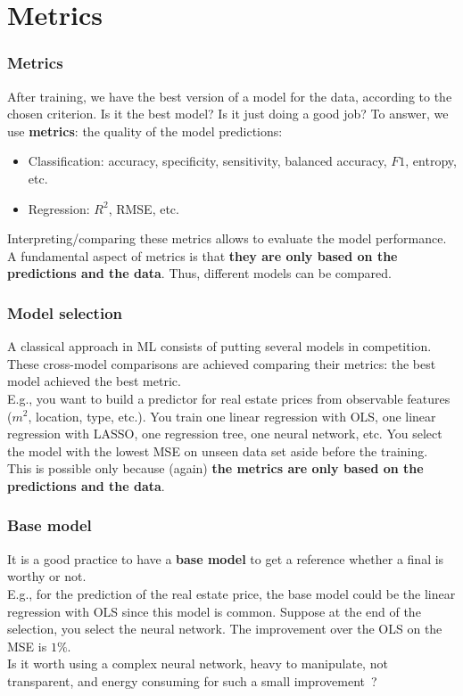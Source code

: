 \section{Metrics}
\begin{frame}
\frametitle{Metrics}
After training, we have the best version of a model for the data, according to the chosen criterion. Is it the best model? Is it just doing a good job? To answer, we use {\bf metrics}: the quality of the model predictions: 
\begin{itemize}
\item Classification: accuracy, specificity, sensitivity, balanced accuracy, $F1$, entropy, etc.
\item Regression: $R^2$, RMSE, etc.
\end{itemize}
Interpreting/comparing these metrics allows to evaluate the model performance.\\
\vspace{0.3cm}
A fundamental aspect of metrics is that {\bf they are only based on the predictions and the data}. Thus, different models can be compared.
\end{frame}
\begin{frame}
\frametitle{Model selection}
A classical approach in ML consists of putting several models in competition. These cross-model comparisons are achieved comparing their metrics: the best model achieved the best metric.\\
\vspace{0.3cm}
E.g., you want to build a predictor for real estate prices from observable features ($m^2$, location, type, etc.). You train one linear regression with OLS, one linear regression with LASSO, one regression tree, one neural network, etc. You select the model with the lowest MSE on unseen data set aside before the training. \\
\vspace{0.3cm}
This is possible only because (again) {\bf the metrics are only based on the predictions and the data}. 
\end{frame}
\begin{frame}
\frametitle{Base model}
It is a good practice to have a {\bf base model} to get a reference whether a final is worthy or not.\\
\vspace{0.3cm} 
E.g., for the prediction of the real estate price, the base model could be the linear regression with OLS since this model is common. Suppose at the end of the selection, you select the neural network. The improvement over the OLS on the MSE is $1\%$.\\ 
\vspace{0.3cm}
Is it worth using a complex neural network, heavy to manipulate, not transparent, and energy consuming for such a small improvement~?
\end{frame}
